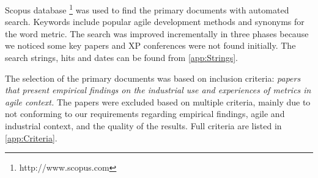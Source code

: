 \documentclass{sig-alternate}
\newcommand{\juha}[1]{\ignorespaces}
\begin{document}
Scopus database \footnote{http://www.scopus.com} was used to find the primary
documents with automated search. Keywords include popular agile development
methods and synonyms for the word metric. The search was improved
incrementally in three phases because we noticed some key papers and XP conferences were not
found initially. The search strings, hits and dates can be found from
\cref{app:Strings}.

The selection of the primary documents was based on inclusion criteria:
\emph{papers that present empirical findings on the industrial use and
experiences of metrics in agile context.} The papers were excluded based on
multiple criteria, mainly due to not conforming to our requirements regarding
empirical findings, agile and industrial context, and the quality of the
results. Full criteria are listed in \cref{app:Criteria}.
\end{document}
